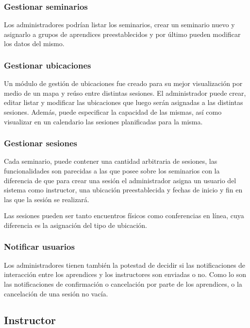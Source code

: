 			\subsubsection{Gestionar seminarios}

			Los administradores podrían listar los seminarios, crear un seminario nuevo y asignarlo a grupos de aprendices preestablecidos y por último pueden modificar los datos del mismo.

			\subsubsection{Gestionar ubicaciones}

			Un módulo de gestión de ubicaciones fue creado para su mejor visualización por medio de un mapa y reúso entre distintas sesiones. El administrador puede crear, editar listar y modificar las ubicaciones que luego serán asignadas a las distintas sesiones. Además, puede especificar la capacidad de las mismas, así como visualizar en un calendario las sesiones planificadas para la misma.

			\subsubsection{Gestionar sesiones}	
			
			Cada seminario, puede contener una cantidad arbitraria de sesiones, las funcionalidades son parecidas a las que posee sobre los seminarios con la diferencia de que para crear una sesión el administrador asigna un usuario del sistema como instructor, una ubicación preestablecida y fechas de inicio y fin en las que la sesión se realizará.

			Las sesiones pueden ser tanto encuentros físicos como conferencias en línea, cuya diferencia es la asignación del tipo de ubicación.

			\subsubsection{Notificar usuarios}

			Los administradores tienen también la potestad de decidir si las notificaciones de interacción entre los aprendices y los instructores son enviadas o no. Como lo son las notificaciones de confirmación o cancelación por parte de los aprendices, o la cancelación de una sesión no vacía.


		\subsection{Instructor} %
		\label{sub:instructor}
		
